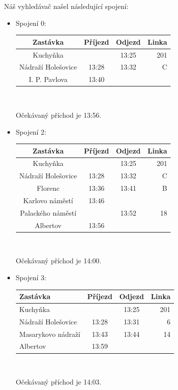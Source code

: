 Náš vyhledávač našel následující spojení:
\begin{itemize}
\item Spojení 0:\\[0mm]
\vspace*{-0.5cm}
\begin{center}
\begin{tabular}{|c c c r|}\hline
{\bf Zastávka}&{\bf Příjezd}&{\bf Odjezd}&{\bf Linka}\\\hline
Kuchyňka&&13:25&201\\
Nádraží Holešovice&13:28&13:32&C\\
I. P. Pavlova&13:40&&\\\hline
\end{tabular} \\[0mm]
\end{center}
Očekávaný příchod je 13:56.

\item Spojení 2:\\
\vspace*{-0.5cm}
\begin{center}
\begin{tabular}{|c c c r|}\hline
{\bf Zastávka}&{\bf Příjezd}&{\bf Odjezd}&{\bf Linka}\\\hline
Kuchyňka&&13:25&201\\
Nádraží Holešovice&13:28&13:32&C\\
Florenc&13:36&13:41&B\\
Karlovo náměstí&13:46&&\\
Palackého náměstí&&13:52&18\\
Albertov&13:56&&\\\hline
\end{tabular} \\[0mm]
\end{center}
Očekávaný příchod je 14:00.

\item Spojení 3:\\
\vspace*{-0.5cm}
\begin{center}
\begin{tabular}{|l c c r|}\hline
{\bf Zastávka}&{\bf Příjezd}&{\bf Odjezd}&{\bf Linka}\\\hline
Kuchyňka&&13:25&201\\
Nádraží Holešovice&13:28&13:31&6\\
Masarykovo nádraží&13:43&13:44&14\\
Albertov&13:59&&\\\hline
\end{tabular}\\[2mm]
\end{center}
Očekávaný příchod je 14:03.
\end{itemize}

